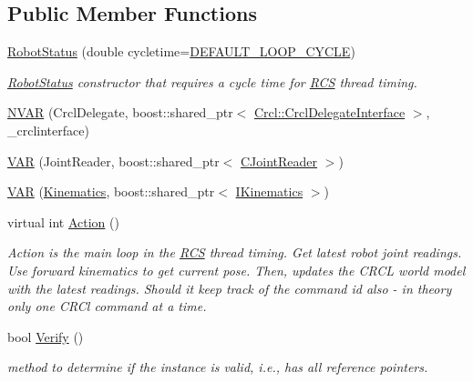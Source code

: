 \subsection*{Public Member Functions}
\begin{DoxyCompactItemize}
\item 
\hyperlink{classRCS_1_1RobotStatus_a3a4edecf6814bd37db609104517983a1}{Robot\-Status} (double cycletime=\hyperlink{RCS_8h_a226eb3a426e9df46b88c4ba34f217203}{D\-E\-F\-A\-U\-L\-T\-\_\-\-L\-O\-O\-P\-\_\-\-C\-Y\-C\-L\-E})
\begin{DoxyCompactList}\small\item\em \hyperlink{classRCS_1_1RobotStatus}{Robot\-Status} constructor that requires a cycle time for \hyperlink{namespaceRCS}{R\-C\-S} thread timing. \end{DoxyCompactList}\item 
\hyperlink{classRCS_1_1RobotStatus_aed67d1057ff99ebe1221aa9fdc3c9e04}{N\-V\-A\-R} (Crcl\-Delegate, boost\-::shared\-\_\-ptr$<$ \hyperlink{classCrcl_1_1CrclDelegateInterface}{Crcl\-::\-Crcl\-Delegate\-Interface} $>$, \-\_\-crclinterface)
\item 
\hyperlink{classRCS_1_1RobotStatus_abd9c969c564c66c5dd4ae92699172742}{V\-A\-R} (Joint\-Reader, boost\-::shared\-\_\-ptr$<$ \hyperlink{classCJointReader}{C\-Joint\-Reader} $>$)
\item 
\hyperlink{classRCS_1_1RobotStatus_abdcfb3be4ed2558ca3e5c745dc669340}{V\-A\-R} (\hyperlink{SanityCheckTests_8cpp_ac2d60ae645ce73be6021c92b37789e7c}{Kinematics}, boost\-::shared\-\_\-ptr$<$ \hyperlink{classIKinematics}{I\-Kinematics} $>$)
\item 
virtual int \hyperlink{classRCS_1_1RobotStatus_ac71a3ac33bfdf37a96dc5a0bf1ce7133}{Action} ()
\begin{DoxyCompactList}\small\item\em Action is the main loop in the \hyperlink{namespaceRCS}{R\-C\-S} thread timing. Get latest robot joint readings. Use forward kinematics to get current pose. Then, updates the C\-R\-C\-L world model with the latest readings.  Should it keep track of the command id also -\/ in theory only one C\-R\-Cl command at a time. \end{DoxyCompactList}\item 
bool \hyperlink{classRCS_1_1RobotStatus_aad11542a68b43feb8c327abafbd94344}{Verify} ()
\begin{DoxyCompactList}\small\item\em method to determine if the instance is valid, i.\-e., has all reference pointers. \end{DoxyCompactList}\end{DoxyCompactItemize}
